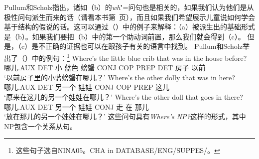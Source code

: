 \largerpage
\noindent
Pullum和Scholz指出，诸如（b）的\emph{wh}"=问句也是相关的，如果我们认为他们是从极性问句派生而来的话（请看本书第~\pageref{Seite-GB-Entscheidungsfragen-Englisch}页），而且如果我们希望展示儿童说如何学会基于结构的假说的话。这可以通过（）中的例子来解释：（a）被派生出的基础形式是（b）。如果我们要把（b）中的第一个助动词前置，那么我们就会得到（c）。
\eal
{}
\zl
但是，（c）是不正确的证据也可以在跟孩子有关的语言中找到。
Pullum和Scholz举出了（）中的例句：\footnote{
这些句子选自NINA05。CHA in DATABASE/ENG/SUPPES/。
}
\eal
\label{wh-Fragen-Hilfsverbinversion}
\ex 
\gll Where's the little blue crib that was in the house before?\\
哪儿.AUX DET 小 蓝色 螃蟹 CONJ COP PREP DET 房子 以前\\
\glt `以前房子里的小蓝螃蟹在哪儿？'
\ex 
\gll Where's the other dolly that was in here?\\
哪儿.AUX DET 另一个 娃娃  CONJ COP PREP 这儿\\
\glt `原来在这儿的另一个娃娃在哪儿？'
\ex 
\gll Where's the other doll that goes in there?\\
哪儿.AUX DET 另一个 娃娃 CONJ 走 在 那儿 \\
\glt `放在那儿的另一个娃娃在哪儿？'
\zl
这些问句具有\emph{Where's NP?}这样的形式，其中NP包含一个关系从句。

